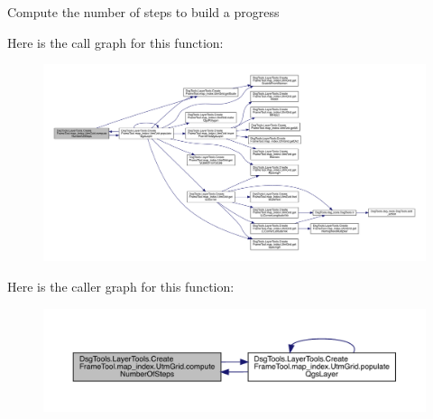 \begin{DoxyVerb}Compute the number of steps to build a progress
\end{DoxyVerb}
 Here is the call graph for this function\+:
\nopagebreak
\begin{figure}[H]
\begin{center}
\leavevmode
\includegraphics[width=350pt]{class_dsg_tools_1_1_layer_tools_1_1_create_frame_tool_1_1map__index_1_1_utm_grid_a50d47526233975cfd827317b5eb52c41_cgraph}
\end{center}
\end{figure}
Here is the caller graph for this function\+:
\nopagebreak
\begin{figure}[H]
\begin{center}
\leavevmode
\includegraphics[width=350pt]{class_dsg_tools_1_1_layer_tools_1_1_create_frame_tool_1_1map__index_1_1_utm_grid_a50d47526233975cfd827317b5eb52c41_icgraph}
\end{center}
\end{figure}
\mbox{\label{class_dsg_tools_1_1_layer_tools_1_1_create_frame_tool_1_1map__index_1_1_utm_grid_ab732f5b04d64f32b3b67eec2ed0217cc}} 
